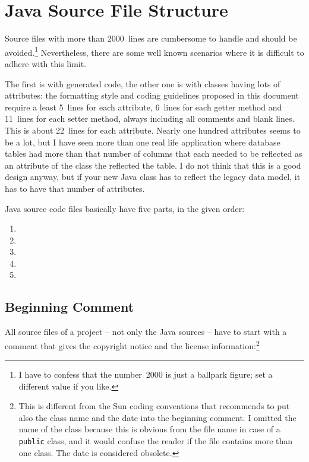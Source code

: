 \documentclass[11pt,a4paper, titlepage, parskip=half, headsepline, footsepline, cleardoublepage=current, headheight=1cm]{scrbook}
\begin{document}

\section{Java Source File Structure}
Source files with more than 2000~lines are cumbersome to handle and should be avoided.\footnote{I have to confess that the number~2000 is just a ballpark figure; set a different value if you like.} Nevertheless, there are some well known scenarios where it is difficult to adhere with this limit.

The first is with generated code, the other one is with classes having lots of attributes: the formatting style and coding guidelines proposed in this document require a least 5~lines for each attribute, 6~lines for each getter method and 11~lines for each setter method, always including all comments and blank lines. This is about 22~lines for each attribute. Nearly one hundred attributes seems to be a lot, but I have seen more than one real life application where database tables had more than that number of columns that each needed to be reflected as an attribute of the class the reflected the table. I do not think that this is a good design anyway, but if your new Java class has to reflect the legacy data model, it has to have that number of attributes.

Java source code files basically have five parts, in the given order:
\begin{enumerate}[nosep]
\item{}
\item{}
\item{}
\item{}
\item{}
\end{enumerate}

\subsection{Beginning Comment}\label{sec:BeginningComment}
All source files of a project – not only the Java sources – have to start with a comment that gives the copyright notice and the license information:\footnote{This is different from the Sun coding conventions\autocite{SUN_CODE_CONVENTIONS:BeginningComments} that recommends to put also the class name and the date into the beginning comment. I omitted the name of the class because this is obvious from the file name in case of a \lstinline|public| class, and it would confuse the reader if the file contains more than one class. The date is considered obsolete.}
\end{document}
